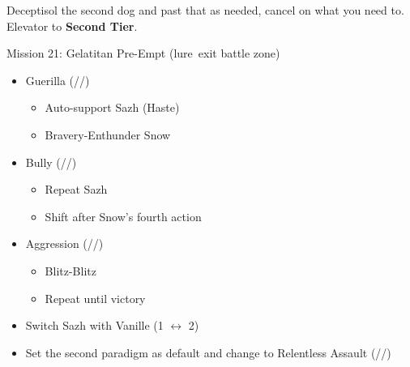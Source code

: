 \renewcommand{\first}{[1] Guerilla (\syn/\sab/\rav)}
\renewcommand{\second}{[2] Devastation (\com/\sab/\com)}
\renewcommand{\third}{[3] Hero's Charge (\syn/\med/\com)}
\renewcommand{\fourth}{[4] Tireless Charge (\com/\med/\com)}
\renewcommand{\fifth}{[5] Bully (\syn/\sab/\com)}
\renewcommand{\sixth}{[6] Aggression (\com/\rav/\com)}
\begin{multicols}{2}

  Deceptisol the second dog and past that as needed, cancel on what you need to.
  Elevator to \textbf{Second Tier}.
  \begin{battle}[0:37]{Mission 21: Gelatitan Pre-Empt (lure\, exit battle zone)}
    \begin{itemize}
      \item \first
            \begin{itemize}
              \item Auto-support Sazh (Haste)
              \item Bravery-Enthunder Snow
            \end{itemize}
      \item \fifth
            \begin{itemize}
              \item Repeat Sazh
              \item Shift after Snow's fourth action
            \end{itemize}
      \item \sixth
            \begin{itemize}
              \item Blitz-Blitz
              \item Repeat until victory
            \end{itemize}
    \end{itemize}
  \end{battle}
  \begin{menu}
    \begin{itemize}
      \paradigm
      \begin{itemize}
        \item Switch Sazh with Vanille (1 $\leftrightarrow$ 2)
        \item Set the second paradigm as default and change to Relentless Assault (\rav/\com/\rav)
      \end{itemize}
    \end{itemize}
  \end{menu}
  \renewcommand{\second}{[2]Relentless Assault (\rav/\com/\rav)}

\end{multicols}
